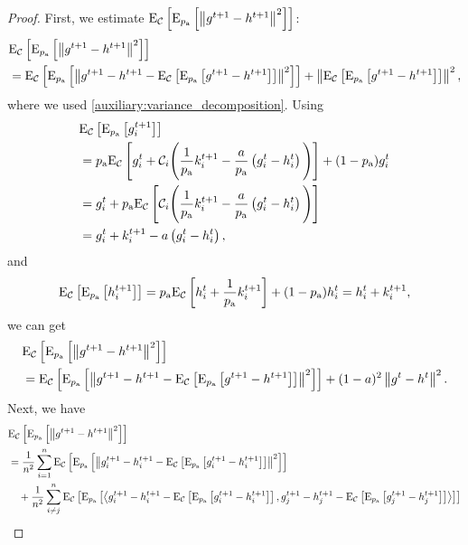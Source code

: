 \documentclass{article}
\newcommand*{\probavailable}{\ensuremath{p_{\textnormal{a}}}}
\begin{document}
\begin{proof}
  First, we estimate $\ExpSub{\cC}{\ExpSub{\probavailable}{\norm{g^{t+1} - h^{t+1}}^2}}$:
  \begin{align*}
      &\ExpSub{\cC}{\ExpSub{\probavailable}{\norm{g^{t+1} - h^{t+1}}^2}} \\
      &=\ExpSub{\cC}{\ExpSub{\probavailable}{\norm{g^{t+1} - h^{t+1} - \ExpSub{\cC}{\ExpSub{\probavailable}{g^{t+1} - h^{t+1}}}}^2}} + \norm{\ExpSub{\cC}{\ExpSub{\probavailable}{g^{t+1} - h^{t+1}}}}^2,
  \end{align*}
  where we used \eqref{auxiliary:variance_decomposition}.
  Using
  \begin{align*}
      &\ExpSub{\cC}{\ExpSub{\probavailable}{g^{t+1}_i}} \\
      &=\probavailable \ExpSub{\cC}{g^{t}_i + \cC_i\Bigg(\frac{1}{\probavailable}k^{t+1}_i - \frac{a}{\probavailable} \left(g^{t}_i - h^{t}_i\right)\Bigg)} + (1 - \probavailable) g^{t}_i \\
      &=g^{t}_i  + \probavailable\ExpSub{\cC}{\cC_i\Bigg(\frac{1}{\probavailable}k^{t+1}_i - \frac{a}{\probavailable} \left(g^{t}_i - h^{t}_i\right)\Bigg)} \\
      &=g^{t}_i  + k^{t+1}_i - a \left(g^{t}_i - h^{t}_i\right), \\
  \end{align*}
  and 
  \begin{align*}
      &\ExpSub{\cC}{\ExpSub{\probavailable}{h^{t+1}_i}} = \probavailable \ExpSub{\cC}{h^t_i + \frac{1}{\probavailable}k^{t+1}_i} + (1 - \probavailable) h^{t}_i = h^{t}_i + k^{t+1}_i, \\
  \end{align*}
  we can get
  \begin{align*}
      &\ExpSub{\cC}{\ExpSub{\probavailable}{\norm{g^{t+1} - h^{t+1}}^2}} \\
      &=\ExpSub{\cC}{\ExpSub{\probavailable}{\norm{g^{t+1} - h^{t+1} - \ExpSub{\cC}{\ExpSub{\probavailable}{g^{t+1} - h^{t+1}}}}^2}} + (1 - a)^2\norm{g^{t} - h^{t}}^2.
  \end{align*}
  Next, we have
  \begin{align*}
    &\ExpSub{\cC}{\ExpSub{\probavailable}{\norm{g^{t+1} - h^{t+1}}^2}} \\
    &=\frac{1}{n^2}\sum_{i=1}^n\ExpSub{\cC}{\ExpSub{\probavailable}{\norm{g^{t+1}_i - h^{t+1}_i - \ExpSub{\cC}{\ExpSub{\probavailable}{g^{t+1}_i - h^{t+1}_i}}}^2}} \\
    &\quad +\frac{1}{n^2}\sum_{i \neq j}^n\ExpSub{\cC}{\ExpSub{\probavailable}{\inp{g^{t+1}_i - h^{t+1}_i - \ExpSub{\cC}{\ExpSub{\probavailable}{g^{t+1}_i - h^{t+1}_i}}}{g^{t+1}_j - h^{t+1}_j - \ExpSub{\cC}{\ExpSub{\probavailable}{g^{t+1}_j - h^{t+1}_j}}}}} \\

\end{align*}
\end{proof}
\end{document}
